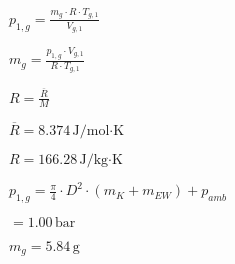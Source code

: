 \( p_{1,g} = \frac{m_g \cdot R \cdot T_{g,1}}{V_{g,1}} \)  

\( m_g = \frac{p_{1,g} \cdot V_{g,1}}{R \cdot T_{g,1}} \)  

\( R = \frac{\overline{R}}{M} \)  

\( \overline{R} = 8.374 \, \text{J/mol·K} \)  

\( R = 166.28 \, \text{J/kg·K} \)  

\( p_{1,g} = \frac{\pi}{4} \cdot D^2 \cdot (m_K + m_{EW}) + p_{amb} \)  

\( = 1.00 \, \text{bar} \)  

\( m_g = 5.84 \, \text{g} \)